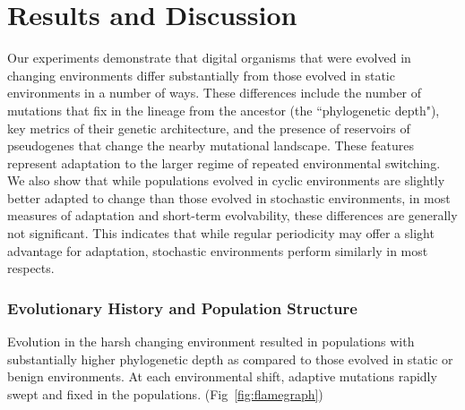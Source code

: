 \documentclass[10pt,letterpaper]{article}
\begin{document}
\section*{Results and Discussion}

Our experiments demonstrate that digital organisms that were evolved in changing environments differ substantially from those evolved in static environments in a number of ways. These differences include the number of mutations that fix in the lineage from the ancestor (the ``phylogenetic depth"), key metrics of their genetic architecture, and the presence of reservoirs of pseudogenes that change the nearby mutational landscape. These features represent adaptation to the larger regime of repeated environmental switching. We also show that while populations evolved in cyclic environments are slightly better adapted to change than those evolved in stochastic environments, in most measures of adaptation and short-term evolvability, these differences are generally not significant. This indicates that while regular periodicity may offer a slight advantage for adaptation, stochastic environments perform similarly in most respects.

\subsubsection*{Evolutionary History and Population Structure}

Evolution in the harsh changing environment resulted in populations with substantially higher phylogenetic depth as compared to those evolved in static or benign environments. At each environmental shift, adaptive mutations rapidly swept and fixed in the populations. (Fig~\ref{fig:flamegraph})
\end{document}
